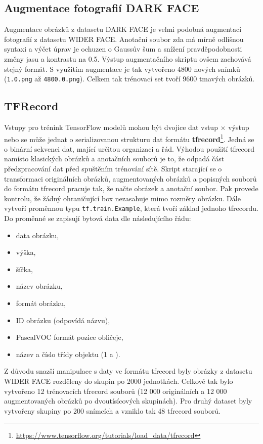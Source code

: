 \subsection*{Augmentace fotografií DARK FACE}
Augmentace obrázků z datasetu DARK FACE je velmi podobná augmentaci fotografií z datasetu WIDER FACE. Anotační soubor zda má mírně odlišnou syntaxi a výčet úprav je ochuzen o Gaussův šum a snížení pravděpodobnosti změny jasu a kontrastu na 0.5. Výstup augmentačního skriptu ovšem zachovává stejný formát. S využitím augmentace je tak vytvořeno 4800 nových snímků (\texttt{1.0.png} až \texttt{4800.0.png}). Celkem tak trénovací set tvoří 9600 tmavých obrázků.

\subsection*{TFRecord}
Vstupy pro trénink TensorFlow modelů mohou být dvojice dat vstup $\times$ výstup nebo se může jednat o serializovanou strukturu dat formátu \textbf{tfrecord}\footnote{\url{https://www.tensorflow.org/tutorials/load_data/tfrecord}}. Jedná se o binární sekvenci dat, mající určitou organizaci a řád. Výhodou použití tfrecord namísto klasických obrázků a anotačních souborů je to, že odpadá část předzpracování dat před spuštěním trénování sítě. Skript starající se o transformaci originálních obrázků, augmentovaných obrázků a popisných souborů do formátu tfrecord pracuje tak, že načte obrázek a anotační soubor. Pak provede kontrolu, že žádný ohraničující box nezasahuje mimo rozměry obrázku. Dále vytvoří proměnnou typu \texttt{tf.train.Example}, která tvoří základ jednoho tfrecordu. Do proměnné se zapisují bytová data dle následujícího řádu:

\begin{itemize}
  \item data obrázku,
  \item výška,
  \item šířka,
  \item název obrázku,
  \item formát obrázku,
  \item ID obrázku (odpovídá názvu),
  \item PascalVOC formát pozice obličeje,
  \item název a číslo třídy objektu (1 a ).
\end{itemize}

Z důvodu snazší manipulace s daty ve formátu tfrecord byly obrázky z datasetu WIDER FACE rozděleny do skupin po 2000 jednotkách. Celkově tak bylo vytvořeno 12 trénovacích tfrecord souborů (12 000 originálních a 12 000 augmentovaných obrázků po dvoutísícových skupinách). Pro druhý dataset byly vytvořeny skupiny po 200 snímcích a vzniklo tak 48 tfrecord souborů.

